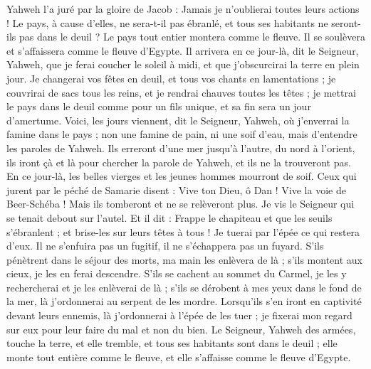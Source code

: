 \begin{multicols}{2}
Yahweh l’a juré par la gloire de Jacob : Jamais je n’oublierai toutes leurs actions !
Le pays, à cause d’elles, ne sera-t-il pas ébranlé, et tous ses habitants ne seront-ils pas dans le deuil ? Le pays tout entier montera comme le fleuve. Il se soulèvera et s’affaissera comme le fleuve d'Egypte.
Il arrivera en ce jour-là, dit le Seigneur, Yahweh, que je ferai coucher le soleil à midi, et que j’obscurcirai la terre en plein jour.
Je changerai vos fêtes en deuil, et tous vos chants en lamentations ; je couvrirai de sacs tous les reins, et je rendrai chauves toutes les têtes ; je mettrai le pays dans le deuil comme pour un fils unique, et sa fin sera un jour d’amertume.
Voici, les jours viennent, dit le Seigneur, Yahweh, où j'enverrai la famine dans le pays ; non une famine de pain, ni une soif d'eau, mais d’entendre les paroles de Yahweh.
Ils erreront d’une mer jusqu'à l'autre, du nord à l'orient, ils iront çà et là pour chercher la parole de Yahweh, et ils ne la trouveront pas.
En ce jour-là, les belles vierges et les jeunes hommes mourront de soif.
Ceux qui jurent par le péché de Samarie disent : Vive ton Dieu, ô Dan ! Vive la voie de Beer-Schéba ! Mais ils tomberont et ne se relèveront plus.
\VerseOne{}Je vis le Seigneur qui se tenait debout sur l'autel. Et il dit : Frappe le chapiteau et que les seuils s’ébranlent ; et brise-les sur leurs têtes à tous ! Je tuerai par l'épée ce qui restera d'eux. Il ne s’enfuira pas un fugitif, il ne s’échappera pas un fuyard.
S’ils pénètrent dans le séjour des morts, ma main les enlèvera de là ; s’ils montent aux cieux, je les en ferai descendre.
S’ils se cachent au sommet du Carmel, je les y rechercherai et je les enlèverai de là ; s’ils se dérobent à mes yeux dans le fond de la mer, là j’ordonnerai au serpent de les mordre.
Lorsqu'ils s'en iront en captivité devant leurs ennemis, là j’ordonnerai à l’épée de les tuer ; je fixerai mon regard sur eux pour leur faire du mal et non du bien.
Le Seigneur, Yahweh des armées, touche la terre, et elle tremble, et tous ses habitants sont dans le deuil ; elle monte tout entière comme le fleuve, et elle s’affaisse comme le fleuve d'Egypte.

\end{multicols}
